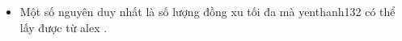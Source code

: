 \begin{itemize}
	\item     Một số nguyên duy nhất là số lượng đồng xu tối đa mà    yenthanh132    có thể lấy được từ    alex    .   
\end{itemize}